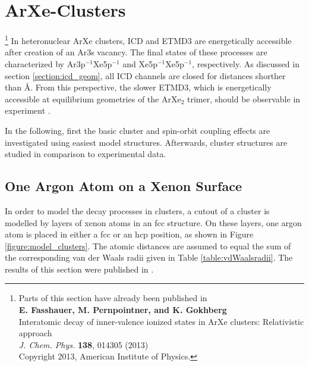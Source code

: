 \section{ArXe-Clusters}
\let\thefootnote\relax\footnote{Parts of this section have already been published in\\
          \textbf{E. Fasshauer, M. Pernpointner, and K. Gokhberg}\\
          Interatomic decay of inner-valence ionized states in ArXe 
          clusters: Relativistic approach\\
          \emph{J. Chem. Phys.} \textbf{138}, 014305 (2013)\\
          Copyright 2013, American Institute of Physics.}
In heteronuclear ArXe clusters, \ac{ICD} and \ac{ETMD}3 are energetically
accessible after creation of an Ar3s vacancy. The final states of these processes
are characterized by Ar3p$^{-1}$Xe5p$^{-1}$ and Xe5p$^{-1}$Xe5p$^{-1}$,
respectively. As discussed in section \ref{section:icd_geom}, all \ac{ICD}
channels are closed
for distances shorther than \unit[10]{\AA}. From this perspective, the
slower \ac{ETMD}3, which is energetically accessible at equilibrium geometries
of the ArXe$_2$ trimer, should be
observable in experiment \cite{Fasshauer10}. 

In the following, first the basic cluster and spin-orbit coupling effects
are investigated using easiest model
structures. Afterwards, cluster structures are studied in comparison to
experimental data.


\subsection{One Argon Atom on a Xenon Surface}
In order to model the decay processes in clusters, a cutout of a cluster
is modelled by layers of xenon atoms in an \ac{fcc} structure. On these
layers, one argon atom is placed in either a \ac{fcc} or an \ac{hcp} position,
as shown in Figure \ref{figure:model_clusters}. The atomic distances are
assumed to equal the sum of the corresponding van der Waals radii given in
Table \ref{table:vdWaalsradii}. The results of this section were published
in \cite{Fasshauer13}.

